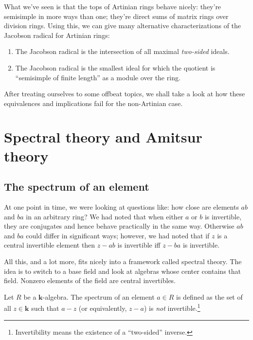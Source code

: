 \documentclass[a4paper]{amsart}
\newcommand{\field}{\mathbf{k}}
\begin{document}
What we've seen is that the tops of Artinian rings behave nicely:
they're semisimple in more ways than one; they're direct sums of
matrix rings over division rings. Using this, we can give many
alternative characterizations of the Jacobson radical for Artinian
rings:

\begin{enumerate}

\item The Jacobson radical is the intersection of all maximal {\em
    two-sided} ideals.

\item The Jacobson radical is the smallest ideal for which the quotient
  is ``semisimple of finite length'' as a module over the ring.

\end{enumerate}

After treating ourselves to some offbeat topics, we shall take a look
at how these equivalences and implications fail for the non-Artinian
case.

\section{Spectral theory and Amitsur theory}

\subsection{The spectrum of an element}

At one point in time, we were looking at questions like: how close are
elements $ab$ and $ba$ in an arbitrary ring? We had noted that when
either $a$ or $b$ is invertible, they are conjugates and hence behave
practically in the same way. Otherwise $ab$ and $ba$ could differ in
significant ways; however, we had noted that if $z$ is a central
invertible element then $z - ab$ is invertible iff $z - ba$ is
invertible.

All this, and a lot more, fits nicely into a framework called spectral
theory. The idea is to switch to a base field and look at algebras
whose center contains that field. Nonzero elements of the field are
central invertibles.

\begin{definer}
  Let $R$ be a $\field$-algebra. The spectrum of an element $a \in R$
  is defined as the set of all $z \in \field$ such that $a - z$ (or
  equivalently, $z - a$) is {\em not}
  invertible.\footnote{Invertibility means the existence of a
    ``two-sided'' inverse.}
\end{definer}
\end{document}
